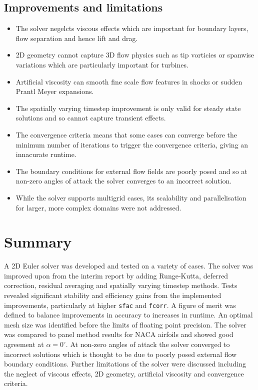 \documentclass{article}
\begin{document}
\subsection{Improvements and limitations}
\begin{itemize}
    \item The solver negelcts viscous effects which are important for boundary layers, flow separation and hence lift and drag.
    \item 2D geometry cannot capture 3D flow physics such as tip vorticies or spanwise variations which are particularly important for turbines.
    \item Artificial viscosity can smooth fine scale flow features in shocks or sudden Prantl Meyer expansions.
    \item The spatially varying timestep improvement is only valid for steady state solutions and so cannot capture transient effects.
    \item The convergence criteria means that some cases can converge before the minimum number of iterations to trigger the convergence criteria, giving an innacurate runtime.
    \item The boundary conditions for external flow fields are poorly posed and so at non-zero angles of attack the solver converges to an incorrect solution.
    \item While the solver supports multigrid cases, its scalability and parallelisation for larger, more complex domains were not addressed.
\end{itemize}

\section{Summary}

A 2D Euler solver was developed and tested on a variety of cases.
The solver was improved upon from the interim report by adding Runge-Kutta, deferred correction, residual averaging and spatially varying timestep methods.
Tests revealed significant stability and efficiency gains from the implemented improvements, particularly at higher \texttt{sfac} and \texttt{fcorr}.
A figure of merit was defined to balance improvements in accuracy to increases in runtime.
An optimal mesh size was identified before the limits of floating point precision.
The solver was compared to panel method results for NACA airfoils and showed good agreement at $\alpha = 0^\circ$.
At non-zero angles of attack the solver converged to incorrect solutions which is thought to be due to poorly posed external flow boundary conditions.
Further limitations of the solver were discussed including the neglect of viscous effects, 2D geometry, artificial viscosity and convergence criteria.
\end{document}
